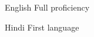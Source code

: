 
\begin{cvskills}

  \cvskill
    {English}
    {Full proficiency}

  \cvskill
    {Hindi}
    {First language}

\end{cvskills}